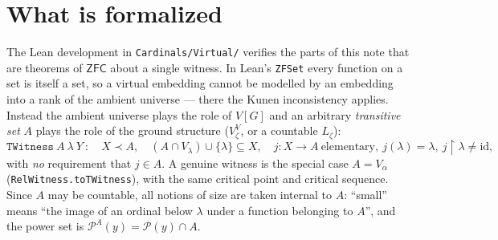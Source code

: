 \documentclass[11pt,letterpaper]{article}
\theoremstyle{definition}
\numberwithin{equation}{section}
\newcommand{\ZFC}{\mathsf{ZFC}}
\newcommand{\Pow}{\mathcal P}
\newcommand{\restr}{\mathbin{\upharpoonright}}
\begin{document}
\section{What is formalized}\label{sec:lean}

The Lean development in \nolinkurl{Cardinals/Virtual/} verifies the parts of this note that are theorems of $\ZFC$ about a single witness. In Lean's \nolinkurl{ZFSet} every function on a set is itself a set, so a virtual embedding cannot be modelled by an embedding into a rank of the ambient universe --- there the Kunen inconsistency applies. Instead the ambient universe plays the role of $V[G]$ and an arbitrary \emph{transitive set} $A$ plays the role of the ground structure ($V^V_\zeta$, or a countable $L_\zeta$):
\[
  \mathtt{TWitness}\ A\ \lambda\ Y\ :\quad X\prec A,\quad (A\cap V_\lambda)\cup\{\lambda\}\subseteq X,\quad j:X\to A\ \text{elementary},\ j(\lambda)=\lambda,\ j\restr\lambda\ne\mathrm{id},
\]
with \emph{no} requirement that $j\in A$. A genuine witness is the special case $A=V_\alpha$ (\nolinkurl{RelWitness.toTWitness}), with the same critical point and critical sequence. Since $A$ may be countable, all notions of size are taken internal to $A$: ``small'' means ``the image of an ordinal below $\lambda$ under a function belonging to $A$'', and the power set is $\Pow^A(y)=\Pow(y)\cap A$.
\end{document}
